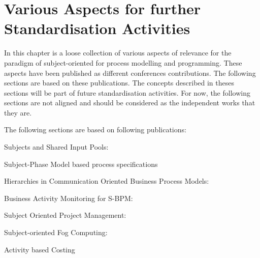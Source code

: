 \chapter{Various Aspects for further Standardisation Activities}


In this chapter is a loose collection of various aspects of relevance for the paradigm of subject-oriented for process modelling and programming.  These aspects have been published as different conferences contributions. The following sections are based on these publications. 
The concepts described in theses sections will be part of future standardisation activities. For now, the following sections are not aligned and should be considered as the independent works that they are. 

The following sections are based on following publications:\\
\begin{list}{-}
	\item Subjects and Shared Input Pools: \cite{article:SharedInputPool}
	\item Subject-Phase Model based process specifications \cite{article:SubjectPhase}
	\item Hierarchies in Communication Oriented Business Process Models: \cite{article:Subject-hierarchies}
	\item Business Activity Monitoring for S-BPM: \cite{article:SubProcessMon}
	\item Subject Oriented Project Management: \cite{article:Subject-Oriented-Project-Management}
	\item Subject-oriented Fog Computing: \cite{article:FogComp}
	\item Activity based Costing \cite{article:SBPMCosting}
\end{list}























